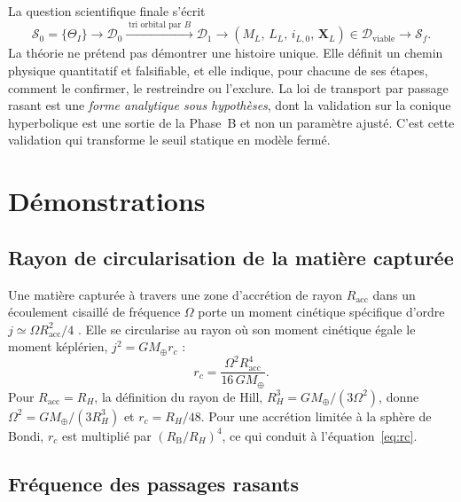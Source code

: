 \documentclass[11pt,a4paper,openany]{report}
\newcommand{\Mt}{M_{\oplus}}
\begin{document}
La question scientifique finale s'écrit
\begin{equation}
\boxed{\;\mathcal{S}_0=\{\Theta_I\}\longrightarrow\mathcal{D}_0
\xrightarrow{\;\text{tri orbital par }B\;}\mathcal{D}_1\longrightarrow
\left(M_L,\,L_L,\,i_{L,0},\,\mathbf{X}_L\right)\in\mathcal{D}_{\mathrm{viable}}
\longrightarrow\mathcal{S}_f.\;}
\label{eq:question}
\end{equation}
La théorie ne prétend pas démontrer une histoire unique. Elle définit un chemin physique
quantitatif et falsifiable, et elle indique, pour chacune de ses étapes, comment le confirmer, le
restreindre ou l'exclure. La loi de transport par passage rasant est une \emph{forme analytique
sous hypothèses}, dont la validation sur la conique hyperbolique est une sortie de la Phase~B et
non un paramètre ajusté. C'est cette validation qui transforme le seuil statique en modèle fermé.

\appendix

\chapter{Démonstrations}
\label{app:demo}

\section{Rayon de circularisation de la matière capturée}
\label{app:rc}

Une matière capturée à travers une zone d'accrétion de rayon $R_{\mathrm{acc}}$ dans un
écoulement cisaillé de fréquence $\Omega$ porte un moment cinétique spécifique d'ordre
$j\simeq\Omega R_{\mathrm{acc}}^2/4$ \cite{QuillenTrilling1998}. Elle se circularise au rayon où son
moment cinétique égale le moment képlérien, $j^2=G\Mt r_c$ :
\begin{equation}
r_c=\frac{\Omega^2R_{\mathrm{acc}}^4}{16\,G\Mt}.
\end{equation}
Pour $R_{\mathrm{acc}}=R_H$, la définition du rayon de Hill, $R_H^3=G\Mt/(3\Omega^2)$, donne
$\Omega^2=G\Mt/(3R_H^3)$ et $r_c=R_H/48$. Pour une accrétion limitée à la sphère de Bondi,
$r_c$ est multiplié par $(R_{\mathrm{B}}/R_H)^4$, ce qui conduit à l'équation~\eqref{eq:rc}.

\section{Fréquence des passages rasants}
\end{document}
